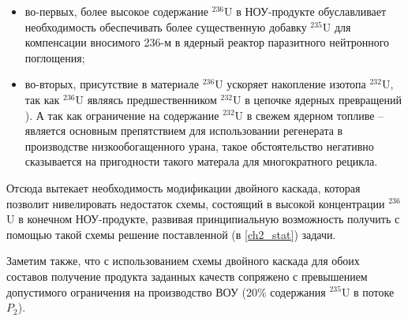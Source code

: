 \begin{itemize}
  \item во-первых, более высокое содержание $^{236}$U в НОУ-продукте обуславливает необходимость обеспечивать более существенную добавку $^{235}$U для компенсации вносимого 236-м в ядерный реактор паразитного нейтронного поглощения;
  \item во-вторых, присутствие в материале $^{236}$U ускоряет накопление изотопа $^{232}$U, так как $^{236}$U являясь предшественником $^{232}$U в цепочке ядерных превращений \cite{smirnovEvolutionIsotopicComposition2012}). А так как ограничение на содержание $^{232}$U в свежем ядерном топливе -- является основным препятствием для использовании регенерата в производстве низкообогащенного урана, такое обстоятельство негативно сказывается на пригодности такого матерала для многократного рецикла.
\end{itemize}

Отсюда вытекает необходимость модификации двойного каскада, которая позволит нивелировать недостаток схемы, состоящий в высокой концентрации $^{236}$U в конечном НОУ-продукте, развивая принципиальную возможность получить с помощью такой схемы решение поставленной (в \ref{ch2_stat}) задачи. 

Заметим также, что с использованием схемы двойного каскада для обоих составов получение продукта заданных качеств сопряжено с превышением допустимого ограничения на производство ВОУ (20\% содержания $^{235}$U в потоке $P_{2}$).













\clearpage
